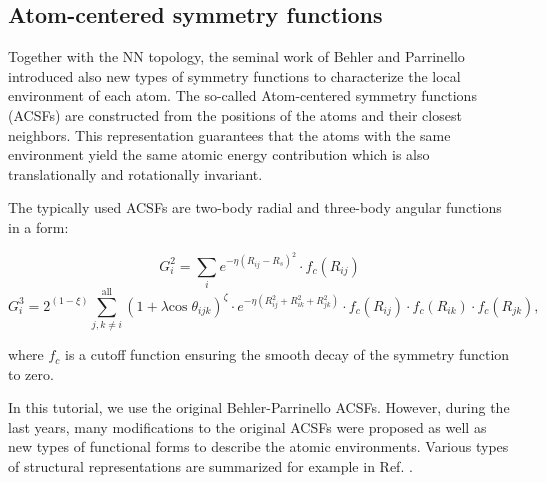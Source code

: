 \documentclass[12pt]{article}
\begin{document}
\subsection{Atom-centered symmetry functions}

Together with the NN topology, the seminal work of Behler and Parrinello introduced also new types of symmetry functions to characterize the local environment of each atom. The so-called Atom-centered symmetry functions (ACSFs)\cite{behl11jcp} are constructed from the positions of the atoms and their closest neighbors. This representation guarantees that the atoms with the same environment yield the same atomic energy contribution which is also translationally and rotationally invariant. 

The typically used ACSFs are two-body radial and three-body angular functions in a form:

\begin{equation}
    G_i^2  = \sum_i e^{-\eta (R_{ij}-R_s)^2} \cdot f_c(R_{ij}) \label{eq:radial}
\end{equation}
\begin{equation}
    G_i^3  = 2^{(1-\xi)} \sum_{j,k \neq i}^{\mathrm{all}}(1 + \lambda \mathrm{cos}\;\theta_{ijk})^{\zeta} \cdot e^{-\eta (R_{ij}^2 + R_{ik}^2 + R_{jk}^2)} \cdot f_c(R_{ij}) \cdot f_c(R_{ik}) \cdot f_c(R_{jk}),
    \label{eq:angular}
\end{equation}

where $f_c$ is a cutoff function ensuring the smooth decay of the symmetry function to zero.   

In this tutorial, we use the original Behler-Parrinello ACSFs. However, during the last years, many modifications to the original ACSFs were proposed as well as new types of functional forms to describe the atomic environments. Various types of structural representations are summarized for example in Ref. .
\end{document}
